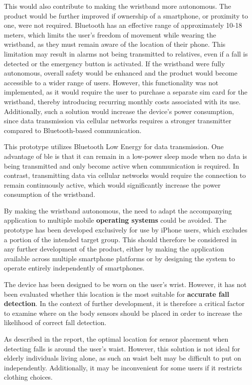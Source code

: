 This would also contribute to making the wristband more autonomous. The product would be further improved if ownership of a smartphone, or proximity to one, were not required. Bluetooth has an effective range of approximately 10-18 meters, which limits the user’s freedom of movement while wearing the wristband, as they must remain aware of the location of their phone. This limitation may result in alarms not being transmitted to relatives, even if a fall is detected or the emergency button is activated. If the wristband were fully autonomous, overall safety would be enhanced and the product would become accessible to a wider range of users. However, this functionality was not implemented, as it would require the user to purchase a separate \gls{sim} card for the wristband, thereby introducing recurring monthly costs associated with its use. Additionally, such a solution would increase the device’s power consumption, since data transmission via cellular networks requires a stronger transmitter compared to Bluetooth-based communication.

This prototype utilizes Bluetooth Low Energy for data transmission. One advantage of \gls{ble} is that it can remain in a low-power sleep mode when no data is being transmitted and only become active when communication is required. In contrast, transmitting data via cellular networks would require the connection to remain continuously active, which would significantly increase the power consumption of the wristband.

By making the wristband autonomous, the need to adapt the accompanying application to multiple mobile \textbf{operating systems} could be avoided. The prototype has been developed exclusively for use by iPhone users, which excludes a portion of the intended target group. This should therefore be considered in any further development of the product, either by making the application available across multiple smartphone platforms or by designing the system to operate entirely independently of smartphones.

The device has been designed to be worn on the user’s wrist. However, it has not been evaluated whether this location is the most suitable for \textbf{accurate fall detection}. In the context of further development, it is therefore a critical factor to examine where on the body sensors should be placed in order to increase the likelihood of correct fall detection.

As described in the report, the optimal location for sensor placement when detecting falls is around the user’s waist. However, this solution is not ideal for elderly individuals living alone, as such an waist belt may be difficult to put on independently. Additionally, it may be inconvenient for some users if it restricts clothing choices.

